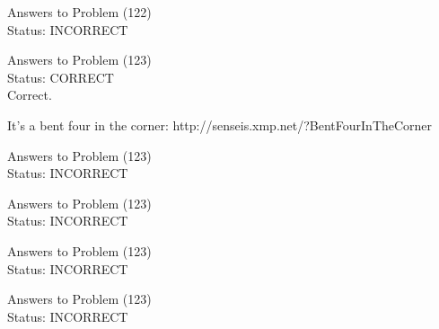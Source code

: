 \documentclass[11pt]{article}
\begin{document}
\begin{minipage}[t]{0.5\textwidth}
  {\centering
  
  Answers to Problem (122)\\
  Status: INCORRECT\\
  
  }
\end{minipage}
\begin{minipage}[t]{0.5\textwidth}
  {\centering
  
  Answers to Problem (123)\\
  Status: CORRECT\\
  Correct.

It's a bent four in the corner: http://senseis.xmp.net/?BentFourInTheCorner\\
  }
\end{minipage}
\begin{minipage}[t]{0.5\textwidth}
  {\centering
  
  Answers to Problem (123)\\
  Status: INCORRECT\\
  
  }
\end{minipage}
\begin{minipage}[t]{0.5\textwidth}
  {\centering
  
  Answers to Problem (123)\\
  Status: INCORRECT\\
  
  }
\end{minipage}
\begin{minipage}[t]{0.5\textwidth}
  {\centering
  
  Answers to Problem (123)\\
  Status: INCORRECT\\
  
  }
\end{minipage}
\begin{minipage}[t]{0.5\textwidth}
  {\centering
  
  Answers to Problem (123)\\
  Status: INCORRECT\\
  
  }
\end{minipage}
\end{document}
